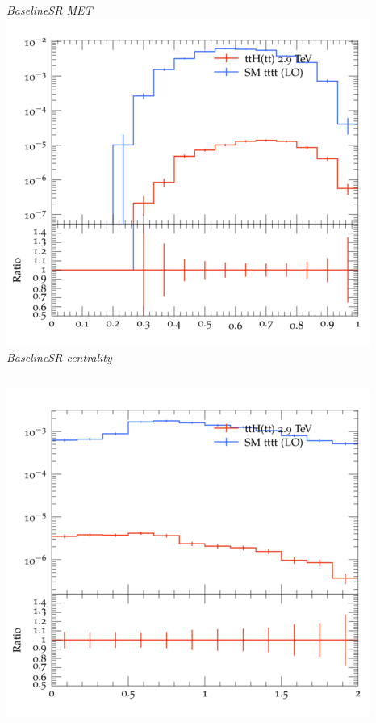 \documentclass{beamer}
\begin{document}
\begin{frame}
\begin{columns}
\textit{\small BaselineSR MET}
\includegraphics[width=\textwidth]{../plots/ttH_2900/tttt_ttH_1LOS/BaselineSR_centrality.png}\\
\textit{\small BaselineSR centrality}
\end{columns}
\begin{columns}
\includegraphics[width=\textwidth]{../plots/ttH_2900/tttt_ttH_1LOS/BaselineSR_deltaR_bl_min.png}\\

\end{columns}
\end{frame}
\end{document}
